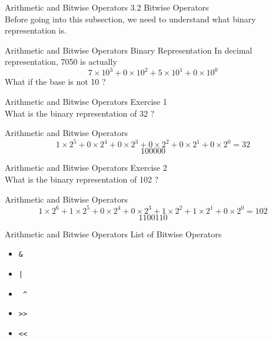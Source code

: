 \documentclass{beamer}
\begin{document}
    \begin{frame}{Arithmetic and Bitwise Operators}
        \color{blue} \Large 3.2 Bitwise Operators \\
        
        \color{black} \normalsize \vskip 10pt 
        Before going into this subsection, we need to understand what binary 
        representation is.
    
    \end{frame}
    
    \begin{frame}{Arithmetic and Bitwise Operators}
        \color{blue} \Large Binary Representation
        \color{black} \normalsize \vskip 10pt
        In decimal representation, 7050 is actually
        \[ 7 \times 10^3 + 0 \times 10^2 + 5 \times 10^1 + 0 \times 10^0 \]
        \vskip 30pt
        What if the base is not 10 ?
    \end{frame}
    
    \begin{frame}{Arithmetic and Bitwise Operators}
        \color{blue} \Large Exercise 1 \\
        \color{black} \normalsize \vskip 10pt
        What is the binary representation of 32 ?
    \end{frame}

    \begin{frame}{Arithmetic and Bitwise Operators}
        $$ 1 \times 2^5 + 0 \times 2^4 + 0 \times 2^3 + 0 \times 2^2 + 
        0 \times 2^1 + 0 \times 2^0 = 32 $$
        $$ 100000 $$
    \end{frame}
    
    \begin{frame}{Arithmetic and Bitwise Operators}
        \color{blue} \Large Exercise 2 \\
        \color{black} \normalsize \vskip 10pt
        What is the binary representation of 102 ?
    \end{frame}

    \begin{frame}{Arithmetic and Bitwise Operators}
        $$ 1 \times 2^6 + 1 \times 2^5 + 0 \times 2^4 + 
        0 \times 2^3 + 1 \times 2^2 + 1 \times 2^1 + 0 \times 2^0 = 102 $$
        $$ 1100110 $$
    \end{frame}
    
    \begin{frame}{Arithmetic and Bitwise Operators}
        \color{blue} \Large List of Bitwise Operators \\
        \color{black} \normalsize \vskip 10pt
        
        \begin{itemize}
            \item \texttt{\&}
            \item \texttt{|}
            \item \texttt{ \^}
            \item \texttt{>>}
            \item \texttt{<<}
        \end{itemize}
    \end{frame}
\end{document}
